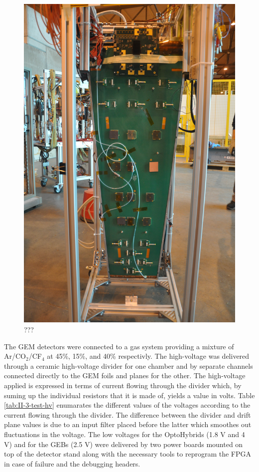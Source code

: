       \begin{figure}[p!]
        \centering
        \includegraphics[width=\textwidth]{img/II-3-test-beam/test-geb.jpg}
        \caption{???}
        \label{fig:II-3-test-geb}
      \end{figure}

      The GEM detectors were connected to a gas system providing a mixture of Ar/CO$_2$/CF$_4$ at 45\%, 15\%, and 40\% respectivly. The high-voltage was delivered through a ceramic high-voltage divider for one chamber and by separate channels connected directly to the GEM foils and planes for the other. The high-voltage applied is expressed in terms of current flowing through the divider which, by suming up the individual resistors that it is made of, yields a value in volts. Table \ref{tab:II-3-test-hv} enumarates the different values of the voltages according to the current flowing through the divider. The difference between the divider and drift plane values is due to an input filter placed before the latter which smoothes out fluctuations in the voltage. The low voltages for the OptoHybrids (1.8 V and 4 V) and for the GEBs (2.5 V) were delivered by two power boards mounted on top of the detector stand along with the necessary tools to reprogram the FPGA in case of failure and the debugging headers.

